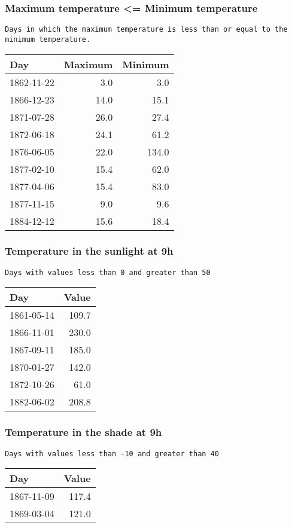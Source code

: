 \documentclass[]{article}
\begin{document}
\subsubsection{Maximum temperature \textless{}= Minimum
temperature}\label{maximum-temperature-minimum-temperature}

\begin{verbatim}
Days in which the maximum temperature is less than or equal to the minimum temperature.
\end{verbatim}

\begin{longtable}[]{@{}lrr@{}}
\toprule
Day & Maximum & Minimum\tabularnewline
\midrule
\endhead
1862-11-22 & 3.0 & 3.0\tabularnewline
1866-12-23 & 14.0 & 15.1\tabularnewline
1871-07-28 & 26.0 & 27.4\tabularnewline
1872-06-18 & 24.1 & 61.2\tabularnewline
1876-06-05 & 22.0 & 134.0\tabularnewline
1877-02-10 & 15.4 & 62.0\tabularnewline
1877-04-06 & 15.4 & 83.0\tabularnewline
1877-11-15 & 9.0 & 9.6\tabularnewline
1884-12-12 & 15.6 & 18.4\tabularnewline
\bottomrule
\end{longtable}

\subsubsection{Temperature in the sunlight at
9h}\label{temperature-in-the-sunlight-at-9h}

\begin{verbatim}
Days with values less than 0 and greater than 50
\end{verbatim}

\begin{longtable}[]{@{}lr@{}}
\toprule
Day & Value\tabularnewline
\midrule
\endhead
1861-05-14 & 109.7\tabularnewline
1866-11-01 & 230.0\tabularnewline
1867-09-11 & 185.0\tabularnewline
1870-01-27 & 142.0\tabularnewline
1872-10-26 & 61.0\tabularnewline
1882-06-02 & 208.8\tabularnewline
\bottomrule
\end{longtable}

\subsubsection{Temperature in the shade at
9h}\label{temperature-in-the-shade-at-9h-1}

\begin{verbatim}
Days with values less than -10 and greater than 40
\end{verbatim}

\begin{longtable}[]{@{}lr@{}}
\toprule
Day & Value\tabularnewline
\midrule
\endhead
1867-11-09 & 117.4\tabularnewline
1869-03-04 & 121.0\tabularnewline
\bottomrule
\end{longtable}
\end{document}
